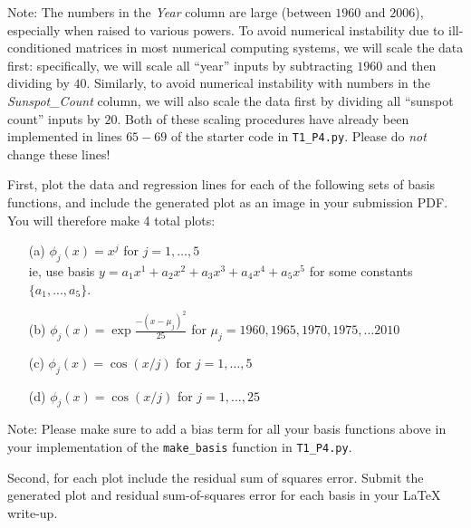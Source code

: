 \documentclass[submit]{harvardml}
\begin{document}
\begin{problem}
\begin{enumerate}
  Note: The numbers in the \emph{Year} column are large (between $1960$ and $2006$), especially when raised to various powers. To avoid numerical instability due to ill-conditioned matrices in most numerical computing systems, we will scale the data first: specifically, we will scale all ``year'' inputs by subtracting $1960$ and then dividing by $40$. Similarly, to avoid numerical instability with numbers in the \emph{Sunspot\_Count} column, we will also scale the data first by dividing all ``sunspot count'' inputs by $20$. Both of these scaling procedures have already been implemented in lines $65-69$ of the starter code in \verb|T1_P4.py|. Please do \emph{not} change these lines!

First, plot the data and regression lines for each of the following sets of basis functions, and include
the generated plot as an image in your submission PDF. You will therefore make 4 total plots:
\begin{enumerate}
	\item[(a)] $\phi_j(x) = x^j$ for $j=1, \ldots, 5$\\
    ie, use basis $y = a_1 x^1 + a_2 x^2 + a_3 x^3 + a_4 x^4 + a_5 x^5$ for some constants $\{a_1, ..., a_5\}$. 
    \item[(b)] $\phi_j(x) = \exp{\frac{-(x-\mu_j)^2}{25}}$ for $\mu_j=1960, 1965, 1970, 1975, \ldots 2010$
	\item[(c)] $\phi_j(x) = \cos(x / j)$ for $j=1, \ldots, 5$
	\item[(d)] $\phi_j(x) = \cos(x / j)$ for $j=1, \ldots, 25$
\end{enumerate}
\vspace{-2mm}


{\footnotesize * Note: Please make sure to add a bias term for all your basis functions above in your implementation of the \verb|make_basis| function in \verb|T1_P4.py|.}
  
Second, for each plot include the residual sum of squares error. Submit the generated plot and residual sum-of-squares error for each basis in your LaTeX write-up.
\end{enumerate}

\end{problem}
\end{document}
